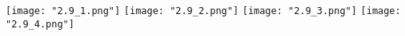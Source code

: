\begin{center}
    \texttt{[image: "2.9\_1.png"]}
    \newpage
    \texttt{[image: "2.9\_2.png"]}
    \texttt{[image: "2.9\_3.png"]}
    \texttt{[image: "2.9\_4.png"]}
\end{center}